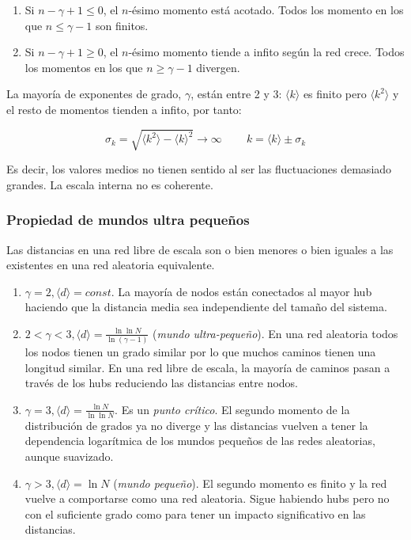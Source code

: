 \documentclass[10pt,spanish, landscape, twocolumn]{article}
\begin{document}
\begin{enumerate}[\color{temacinco}{$\dagger$}]
    \item Si $n - \gamma + 1 \leq 0$, el $n$-ésimo momento está acotado. Todos los momento en los que $n \leq \gamma - 1$ son finitos.
    \item Si $n - \gamma + 1 \geq 0$, el $n$-ésimo momento tiende a infito según la red crece. Todos los momentos en los que $n \geq \gamma - 1$ divergen.
\end{enumerate}

La mayoría de exponentes de grado, $\gamma$, están entre 2 y 3: $\langle k \rangle$ es finito pero $\langle k^2 \rangle$ y el resto de momentos tienden a infito, por tanto:

\begin{displaymath}
    \sigma_k = \sqrt{\langle k^2 \rangle - \langle k \rangle^2} \rightarrow \infty \qquad\ k = \langle k \rangle \pm \sigma_k
\end{displaymath}

Es decir, los valores medios no tienen sentido al ser las fluctuaciones demasiado grandes. La escala interna no es coherente.

\subsubsection{\textcolor{temacinco}Propiedad de mundos ultra pequeños}
Las distancias en una red libre de escala son o bien menores o bien iguales a las existentes en una red aleatoria equivalente.

\begin{enumerate}[\color{temacinco}{$\bigstar$}]
    \item $\gamma = 2, \langle d \rangle = const$. La mayoría de nodos están conectados al mayor hub haciendo que la distancia media sea independiente del tamaño del sistema.
    \item $2 < \gamma < 3, \langle d \rangle = \frac{\ln \ln N}{\ln (\gamma -1)}$ (\textit{\textcolor{temacinco}{mundo ultra-pequeño}}). En una red aleatoria todos los nodos tienen un grado similar por lo que muchos caminos tienen una longitud similar. En una red libre de escala, la mayoría de caminos pasan a través de los hubs reduciendo las distancias entre nodos.
    \item $\gamma = 3, \langle d \rangle = \frac{\ln N}{\ln \ln N}$. Es un \textit{\textcolor{temacinco}{punto crítico}}. El segundo momento de la distribución de grados ya no diverge y las distancias vuelven a tener la dependencia logarítmica de los mundos pequeños de las redes aleatorias, aunque suavizado.
    \item $\gamma > 3, \langle d \rangle = \ln N$ (\textit{\textcolor{temacinco}{mundo pequeño}}). El segundo momento es finito y la red vuelve a comportarse como una red aleatoria. Sigue habiendo hubs pero no con el suficiente grado como para tener un impacto significativo en las distancias.
\end{enumerate}
\end{document}
